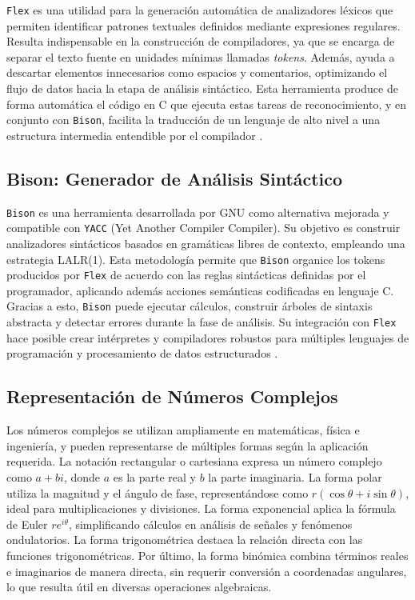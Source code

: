 \documentclass{article}
\begin{document}
\texttt{Flex} es una utilidad para la generación automática de analizadores léxicos que permiten identificar patrones textuales definidos mediante expresiones regulares. Resulta indispensable en la construcción de compiladores, ya que se encarga de separar el texto fuente en unidades mínimas llamadas \textit{tokens}. Además, ayuda a descartar elementos innecesarios como espacios y comentarios, optimizando el flujo de datos hacia la etapa de análisis sintáctico. Esta herramienta produce de forma automática el código en C que ejecuta estas tareas de reconocimiento, y en conjunto con \texttt{Bison}, facilita la traducción de un lenguaje de alto nivel a una estructura intermedia entendible por el compilador \cite{flex}.

\subsection*{Bison: Generador de Análisis Sintáctico}

\texttt{Bison} es una herramienta desarrollada por GNU como alternativa mejorada y compatible con \texttt{YACC} (Yet Another Compiler Compiler). Su objetivo es construir analizadores sintácticos basados en gramáticas libres de contexto, empleando una estrategia LALR(1). Esta metodología permite que \texttt{Bison} organice los tokens producidos por \texttt{Flex} de acuerdo con las reglas sintácticas definidas por el programador, aplicando además acciones semánticas codificadas en lenguaje C. Gracias a esto, \texttt{Bison} puede ejecutar cálculos, construir árboles de sintaxis abstracta y detectar errores durante la fase de análisis. Su integración con \texttt{Flex} hace posible crear intérpretes y compiladores robustos para múltiples lenguajes de programación y procesamiento de datos estructurados \cite{bison}.

\subsection*{Representación de Números Complejos}

Los números complejos se utilizan ampliamente en matemáticas, física e ingeniería, y pueden representarse de múltiples formas según la aplicación requerida. La notación rectangular o cartesiana expresa un número complejo como $a + bi$, donde $a$ es la parte real y $b$ la parte imaginaria. La forma polar utiliza la magnitud y el ángulo de fase, representándose como $r(\cos\theta + i\sin\theta)$, ideal para multiplicaciones y divisiones. La forma exponencial aplica la fórmula de Euler $re^{i\theta}$, simplificando cálculos en análisis de señales y fenómenos ondulatorios. La forma trigonométrica destaca la relación directa con las funciones trigonométricas. Por último, la forma binómica combina términos reales e imaginarios de manera directa, sin requerir conversión a coordenadas angulares, lo que resulta útil en diversas operaciones algebraicas.
\end{document}
